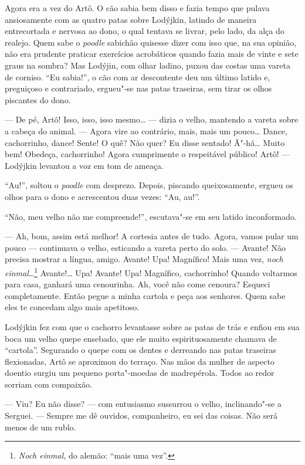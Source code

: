 Agora era a vez do Artô. O cão sabia bem disso e fazia tempo que pulava
ansiosamente com as quatro patas sobre Lodýjkin, latindo de maneira
entrecortada e nervosa ao dono, o qual tentava se livrar, pelo lado, da
alça do realejo. Quem sabe o \emph{poodle} sabichão quisesse dizer com
isso que, na sua opinião, não era prudente praticar exercícios
acrobáticos quando fazia mais de vinte e sete graus na sombra? Mas
Lodýjin, com olhar ladino, puxou das costas uma vareta de corniso. ``Eu
sabia!'', o cão com ar descontente deu um último latido e, preguiçoso e
contrariado, ergueu"-se nas patas traseiras, sem tirar os olhos piscantes
do dono.

--- De pé, Artô! Isso, isso, isso mesmo\ldots{} --- dizia o velho, mantendo a
vareta sobre a cabeça do animal. --- Agora vire ao contrário, mais, mais
um pouco\ldots{} Dance, cachorrinho, dance! Sente! O quê? Não quer? Eu disse
sentado! Ã"-hã\ldots{} Muito bem! Obedeça, cachorrinho! Agora cumprimente o
respeitável público! Artô! --- Lodýjkin levantou a voz em tom de ameaça.

``Au!'', soltou o \emph{poodle} com desprezo. Depois, piscando queixosamente,
ergueu os olhos para o dono e acrescentou duas vezes: ``Au, au!''.

``Não, meu velho não me compreende!'', escutava"-se em seu latido
inconformado.

--- Ah, bom, assim está melhor! A cortesia antes de tudo. Agora, vamos
pular um pouco --- continuava o velho, esticando a vareta perto do solo.
--- Avante! Não precisa mostrar a língua, amigo. Avante! Upa! Magnífico!
Mais uma vez, \emph{noch einmal}\ldots{}\footnote{\emph{Noch einmal,} do
  alemão: ``mais uma vez''.} Avante!\ldots{} Upa! Avante! Upa! Magnífico,
cachorrinho! Quando voltarmos para casa, ganhará uma cenourinha. Ah,
você não come cenoura? Esqueci completamente. Então pegue a minha
cartola e peça aos senhores. Quem sabe eles te concedam algo mais
apetitoso.

Lodýjkin fez com que o cachorro levantasse sobre as patas de trás e
enfiou em sua boca um velho quepe ensebado, que ele muito
espirituosamente chamava de ``cartola''. Segurando o quepe com os dentes
e derreando nas patas traseiras flexionadas, Artô se aproximou do
terraço. Nas mãos da mulher de aspecto doentio surgiu um pequeno
porta"-moedas de madrepérola. Todos ao redor sorriam com compaixão.

--- Viu? Eu não disse? --- com entusiasmo sussurrou o velho,
inclinando"-se a Serguei. --- Sempre me dê ouvidos, companheiro, eu sei
das coisas. Não será menos de um rublo.

